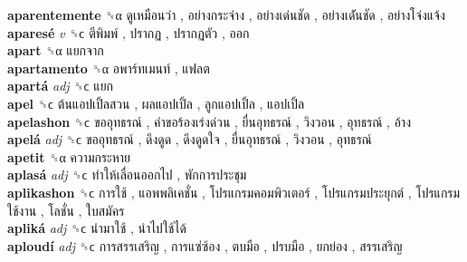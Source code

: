 \textbf{aparentemente} ␝α   ดูเหมือนว่า ,  อย่างกระจ่าง ,  อย่างเด่นชัด ,  อย่างเด่ันชัด ,  อย่างโจ่งแจ้ง   \\
\textbf{aparesé} \emph{v}  ␝ϲ   ตีพิมพ์ ,  ปรากฏ ,  ปรากฏตัว ,  ออก   \\
\textbf{apart} ␝α   แยกจาก   \\
\textbf{apartamento} ␝α   อพาร์ทเมนท์ ,  แฟลต   \\
\textbf{apartá} \emph{adj}  ␝ϲ   แยก   \\
\textbf{apel} ␝ϲ   ต้นแอปเปิ้ลสวน ,  ผลแอปเปิ้ล ,  ลูกแอปเปิ้ล ,  แอปเปิ้ล   \\
\textbf{apelashon} ␝ϲ   ขออุทธรณ์ ,  คำขอร้องเร่งด่วน ,  ยื่นอุทธรณ์ ,  วิงวอน ,  อุทธรณ์ ,  อ้าง   \\
\textbf{apelá} \emph{adj}  ␝ϲ   ขออุทธรณ์ ,  ดึงดูด ,  ดึงดูดใจ ,  ยื่นอุทธรณ์ ,  วิงวอน ,  อุทธรณ์   \\
\textbf{apetit} ␝α   ความกระหาย   \\
\textbf{aplasá} \emph{adj}  ␝ϲ   ทำให้เลื่อนออกไป ,  พักการประชุม   \\
\textbf{aplikashon} ␝ϲ   การใช้ ,  แอพพลิเคชั่น ,  โปรแกรมคอมพิวเตอร์ ,  โปรแกรมประยุกต์ ,  โปรแกรมใช้งาน ,  โลชั่น ,  ใบสมัคร   \\
\textbf{apliká} \emph{adj}  ␝ϲ   นำมาใช้ ,  นำไปใช้ได้   \\
\textbf{aploudí} \emph{adj}  ␝ϲ   การสรรเสริญ ,  การแซ่ซ้อง ,  ตบมือ ,  ปรบมือ ,  ยกย่อง ,  สรรเสริญ   \\
